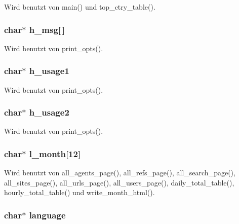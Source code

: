 Wird benutzt von main() und top\_\-ctry\_\-table().
\subsubsection{\setlength{\rightskip}{0pt plus 5cm}char$\ast$ {\bf h\_\-msg}[$\,$]}\label{lang_8h_b5b6cedf99598af62b8cd4bc308493b4}




Wird benutzt von print\_\-opts().
\subsubsection{\setlength{\rightskip}{0pt plus 5cm}char$\ast$ {\bf h\_\-usage1}}\label{lang_8h_9ba617b9ad4b243163879779992cb922}




Wird benutzt von print\_\-opts().
\subsubsection{\setlength{\rightskip}{0pt plus 5cm}char$\ast$ {\bf h\_\-usage2}}\label{lang_8h_3b3adac04f9e05f7ff5b592fcf18cdc6}




Wird benutzt von print\_\-opts().
\subsubsection{\setlength{\rightskip}{0pt plus 5cm}char$\ast$ {\bf l\_\-month}[12]}\label{lang_8h_e75828f9450cccbb02d410d60a6caa1d}




Wird benutzt von all\_\-agents\_\-page(), all\_\-refs\_\-page(), all\_\-search\_\-page(), all\_\-sites\_\-page(), all\_\-urls\_\-page(), all\_\-users\_\-page(), daily\_\-total\_\-table(), hourly\_\-total\_\-table() und write\_\-month\_\-html().
\subsubsection{\setlength{\rightskip}{0pt plus 5cm}char$\ast$ {\bf language}}\label{lang_8h_8ae4b47621b125e915cee8ccdaa2095c}




